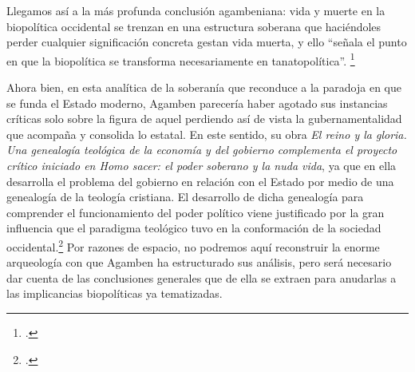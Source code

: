 Llegamos así a la más profunda conclusión agambeniana: vida y muerte en la biopolítica occidental se trenzan en una estructura soberana que haciéndoles perder cualquier significación concreta gestan vida muerta, y ello \enquote{señala el punto en que la biopolítica se transforma necesariamente en tanatopolítica}. \footcite[180]{@7101-AGAMBEN2003}

Ahora bien, en esta analítica de la soberanía que reconduce a la paradoja en que se funda el Estado moderno, Agamben parecería haber agotado sus instancias críticas solo sobre la figura de aquel perdiendo así de vista la gubernamentalidad que acompaña y consolida lo estatal. En este sentido, su obra \textit{El reino y la gloria. Una genealogía teológica de la economía y del gobierno complementa el proyecto crítico iniciado en Homo sacer: el poder soberano y la nuda vida}, ya que en ella desarrolla el problema del gobierno en relación con el Estado por medio de una genealogía de la teología cristiana. El desarrollo de dicha genealogía para comprender el funcionamiento del poder político viene justificado por la gran influencia que el paradigma teológico tuvo en la conformación de la sociedad occidental.\footcite[13]{@7102-AGAMBEN2008} Por razones de espacio, no podremos aquí reconstruir la enorme arqueología con que Agamben ha estructurado sus análisis, pero será necesario dar cuenta de las conclusiones generales que de ella se extraen para anudarlas a las implicancias biopolíticas ya tematizadas.

